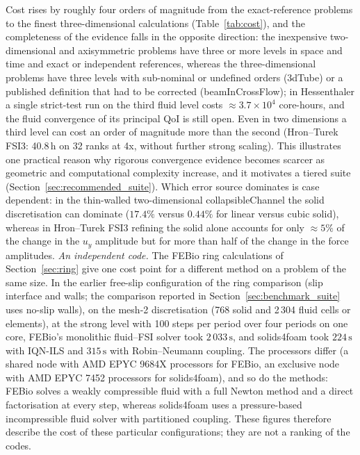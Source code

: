 Cost rises by roughly four orders of magnitude from the exact-reference problems to the finest three-dimensional calculations (Table~\ref{tab:cost}), and the completeness of the evidence falls in the opposite direction: the inexpensive two-dimensional and axisymmetric problems have three or more levels in space and time and exact or independent references, whereas the three-dimensional problems have three levels with sub-nominal or undefined orders (3dTube) or a published definition that had to be corrected (beamInCrossFlow); in Hessenthaler a single strict-test run on the third fluid level costs $\approx3.7\times10^{4}$ core-hours, and the fluid convergence of its principal QoI is still open. Even in two dimensions a third level can cost an order of magnitude more than the second (Hron--Turek FSI3: 40.8\,h on 32 ranks at 4x, without further strong scaling).
This illustrates one practical reason why rigorous convergence evidence becomes scarcer as geometric and computational complexity increase, and it motivates a tiered suite (Section~\ref{sec:recommended_suite}).
Which error source dominates is case dependent: in the thin-walled two-dimensional collapsibleChannel the solid discretisation can dominate ($17.4\%$ versus $0.44\%$ for linear versus cubic solid), whereas in Hron--Turek FSI3 refining the solid alone accounts for only $\approx5\%$ of the change in the $u_y$ amplitude but for more than half of the change in the force amplitudes.
\emph{An independent code.}
The FEBio ring calculations of Section~\ref{sec:ring} give one cost point for a different method on a problem of the same size.
In the earlier free-slip configuration of the ring comparison (slip interface and walls; the comparison reported in Section~\ref{sec:benchmark_suite} uses no-slip walls), on the mesh-2 discretisation (768 solid and 2\,304 fluid cells or elements), at the strong level with 100 steps per period over four periods on one core, FEBio's monolithic fluid--FSI solver took $2\,033\,\mathrm{s}$, and solids4foam took $224\,\mathrm{s}$ with IQN-ILS and $315\,\mathrm{s}$ with Robin--Neumann coupling.
The processors differ (a shared node with AMD EPYC 9684X processors for FEBio, an exclusive node with AMD EPYC 7452 processors for solids4foam), and so do the methods: FEBio solves a weakly compressible fluid with a full Newton method and a direct factorisation at every step, whereas solids4foam uses a pressure-based incompressible fluid solver with partitioned coupling.
These figures therefore describe the cost of these particular configurations; they are not a ranking of the codes.
